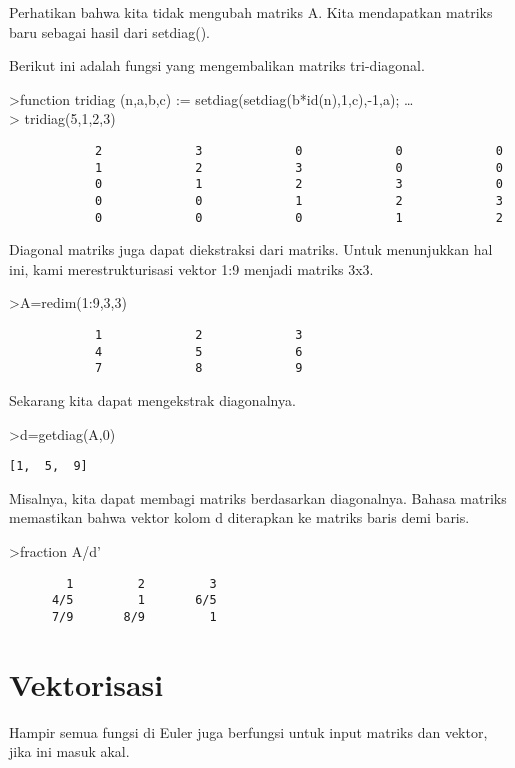 \documentclass[
]{book}
\begin{document}
Perhatikan bahwa kita tidak mengubah matriks A. Kita mendapatkan matriks baru sebagai hasil dari setdiag().

Berikut ini adalah fungsi yang mengembalikan matriks tri-diagonal.

\textgreater function tridiag (n,a,b,c) := setdiag(setdiag(b*id(n),1,c),-1,a); \ldots{}\\
\textgreater{} tridiag(5,1,2,3)

\begin{verbatim}
            2             3             0             0             0 
            1             2             3             0             0 
            0             1             2             3             0 
            0             0             1             2             3 
            0             0             0             1             2 
\end{verbatim}

Diagonal matriks juga dapat diekstraksi dari matriks. Untuk menunjukkan hal ini, kami merestrukturisasi vektor 1:9 menjadi matriks 3x3.

\textgreater A=redim(1:9,3,3)

\begin{verbatim}
            1             2             3 
            4             5             6 
            7             8             9 
\end{verbatim}

Sekarang kita dapat mengekstrak diagonalnya.

\textgreater d=getdiag(A,0)

\begin{verbatim}
[1,  5,  9]
\end{verbatim}

Misalnya, kita dapat membagi matriks berdasarkan diagonalnya. Bahasa matriks memastikan bahwa vektor kolom d diterapkan ke matriks baris demi baris.

\textgreater fraction A/d'

\begin{verbatim}
        1         2         3 
      4/5         1       6/5 
      7/9       8/9         1 
\end{verbatim}

\chapter{Vektorisasi}\label{vektorisasi}

Hampir semua fungsi di Euler juga berfungsi untuk input matriks dan vektor, jika ini masuk akal.
\end{document}
